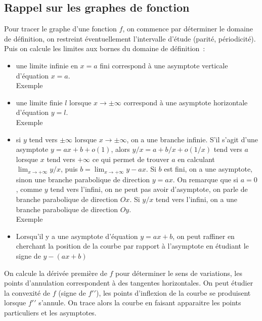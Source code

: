 \documentclass[a4paper,11pt]{book}
\begin{document}
\begin{giacjshere}
\subsection{Rappel sur les graphes de fonction}
Pour tracer le graphe d'une fonction $f$, on commence par
d\'eterminer le domaine de
d\'efinition, on restreint \'eventuellement l'intervalle d'\'etude
(parit\'e, p\'eriodicit\'e). Puis on calcule les limites aux bornes
du domaine de d\'efinition~:
\begin{itemize}
\item une limite infinie en $x=a$ fini correspond \`a une asymptote
verticale d'\'equation $x=a$.\\
Exemple 
\item une limite finie $l$ lorsque $x\rightarrow \pm \infty$ correspond
\`a une asymptote horizontale d'\'equation $y=l$.\\
Exemple 
\item si $y$ tend vers $\pm \infty$ lorsque $x\rightarrow \pm \infty$,
on a une branche infinie. S'il s'agit d'une asymptote $y=ax+b+o(1)$, alors
$y/x=a+b/x+o(1/x)$ tend vers $a$ lorsque $x$ tend vers $+\infty$ ce qui
permet de trouver $a$ en calculant $\lim_{x\rightarrow +\infty} y/x$,
puis $b=\lim_{x\rightarrow +\infty}y-ax$. Si $b$ est fini, on a une
asymptote, sinon une branche parabolique de direction $y=ax$. 
On remarque que si $a=0$,
comme $y$ tend vers l'infini, on ne peut pas avoir d'asymptote, on
parle de branche parabolique de direction $Ox$. Si $y/x$ tend vers
l'infini, on a une branche parabolique de direction $Oy$.\\
Exemple 
\item Lorsqu'il y a une asymptote d'\'equation $y=ax+b$, 
on peut raffiner en cherchant la
position de la courbe par rapport \`a l'asymptote en \'etudiant le
signe de $y-(ax+b)$
\end{itemize}
On calcule la d\'eriv\'ee premi\`ere de $f$ pour d\'eterminer le sens
de variations, les points d'annulation correspondent \`a des tangentes
horizontales. On peut \'etudier la convexit\'e de $f$ (signe de
$f'{'}$), les points d'inflexion de la courbe se produisent lorsque
$f'{'}$ s'annule.
On trace alors la courbe en faisant apparaitre les points particuliers
et les asymptotes.


\end{giacjshere}
\end{document}
